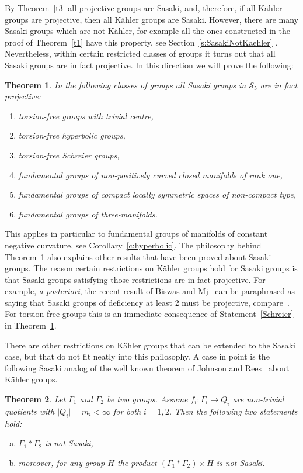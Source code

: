 \documentclass[12pt,leqno]{amsart}
\newcommand{\lra}{\longrightarrow}
\newcommand{\Sg}{\mathcal{S}}
\newtheorem{theor}{Theorem}
\begin{document}
By Theorem~\ref{t3} all projective groups are Sasaki, and, therefore, if all K\"ahler groups are projective, then
all K\"ahler groups are Sasaki. However, there are many Sasaki groups which are not K\"ahler, for 
example all the ones constructed in the proof of Theorem~\ref{t1} have this property, 
see Section~\ref{s:SasakiNotKaehler} . Nevertheless, within certain restricted classes of groups 
it turns out that all Sasaki groups are in fact projective. In this direction we will prove the 
following:
\begin{theor}\label{t4}
In the following classes of groups all Sasaki groups in $\Sg_5$ are in fact projective:
\begin{enumerate}
\item \label{nocentre} torsion-free groups with trivial centre,
\item \label{hyperbolic} torsion-free hyperbolic groups,
\item \label{Schreier}  torsion-free Schreier groups,
\item \label{rankone}  fundamental groups of non-positively curved closed manifolds of rank one,
\item \label{SSNT}  fundamental groups of compact locally symmetric spaces of non-compact type,
\item \label{3D}  fundamental groups of three-manifolds.
\end{enumerate}
\end{theor}
This applies in particular to fundamental groups of manifolds of constant negative curvature,
see Corollary~\ref{c:hyperbolic}.
The philosophy behind Theorem~\ref{t4} also explains other results that have been proved about 
Sasaki groups. The reason certain restrictions on K\"ahler groups hold for Sasaki groups is that
Sasaki groups satisfying those restrictions are in fact projective. For example, {\it a posteriori}, the recent 
result of Biswas and Mj~\cite{BM} can be paraphrased as saying that Sasaki groups of deficiency
at least $2$ must be projective, compare~\cite{Kot2}. For torsion-free groups this is an immediate consequence 
of Statement~\ref{Schreier} in Theorem~\ref{t4}.


There are other restrictions on K\"ahler groups that can be extended to the Sasaki case, but 
that do not fit neatly into this philosophy. A case in point is the 
following Sasaki analog of the well known theorem of Johnson and Rees~\cite{johnsonrees87} about K\"ahler groups. 
\begin{theor}\label{t5}
Let $\Gamma_1$ and $\Gamma_2$ be two groups. Assume $f_i\colon \Gamma_i\lra Q_i$ are non-trivial quotients with $\vert Q_i\vert=m_i<\infty$ for both $i=1,2$. Then the following two statements hold:
\begin{enumerate}[(a)]
\item $\Gamma_1*\Gamma_2$ is not Sasaki, \label{johnsonparta}
\item moreover, for any group $H$ the product $(\Gamma_1*\Gamma_2)\times H$ is not Sasaki. \label{johnsonpartb}
\end{enumerate} 
\end{theor}
\end{document}
